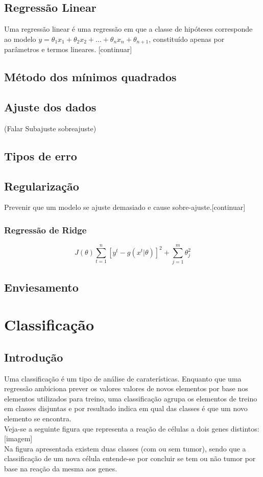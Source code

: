 \documentclass[]{report}
\begin{document}
\section{Regressão Linear}
Uma regressão linear é uma regressão em que a classe de hipóteses corresponde ao modelo $y = \theta_1 x_1 + \theta_2 x_2 + \dots + \theta_n x_n + \theta_{n+1}$, constituído apenas por parâmetros e termos lineares. [continuar]
\section{Método dos mínimos quadrados}
\section{Ajuste dos dados}
(Falar Subajuste sobreajuste)
\section{Tipos de erro}
\section{Regularização}
Prevenir que um modelo se ajuste demasiado e cause sobre-ajuste.[continuar]
\subsection{Regressão de Ridge}
$$J(\theta) \sum_{t=1}^n[y^t - g(x^t | \theta)]^2 + \sum_{j=1}^m \theta^2_j$$
\section{Enviesamento}
\chapter{Classificação}
\section{Introdução}
Uma classificação é um tipo de análise de caraterísticas. Enquanto que uma regressão ambiciona prever os valores valores de novos elementos por base nos elementos utilizados para treino, uma classificação agrupa os elementos de treino em classes disjuntas e por resultado indica em qual das classes é que um novo elemento se encontra.\\[0.2cm]
Veja-se a seguinte figura que representa a reação de células a dois genes distintos: [imagem]\\
Na figura apresentada existem duas classes (com ou sem tumor), sendo que a classificação de um nova célula entende-se por concluir se tem ou não tumor por base na reação da mesma aos genes.
\end{document}
